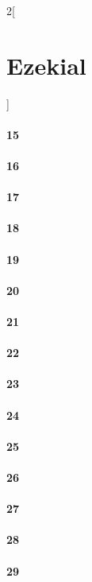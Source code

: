 \documentclass{book}
\begin{document}
\begin{multicols}{2}[\part{Ezekial}]
\subsection*{15}
\subsection*{16}
\subsection*{17}
\subsection*{18}
\subsection*{19}
\subsection*{20}
\subsection*{21}
\subsection*{22}
\subsection*{23}
\subsection*{24}
\subsection*{25}
\subsection*{26}
\subsection*{27}
\subsection*{28}
\subsection*{29}

\end{multicols}
\end{document}
